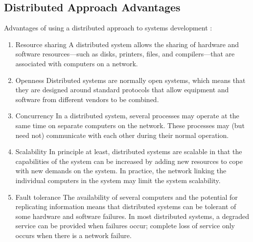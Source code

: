 \documentclass[12pt,a4paper,final,twoside,onecolumn,titlepage]{book}
\begin{document}
\subsection{Distributed Approach Advantages}
Advantages of using a distributed approach to systems development \cite{SWE9}:
\begin{enumerate}
\item Resource sharing A distributed system allows the sharing of hardware and software resources—such as disks, printers, files, and compilers—that are associated with computers on a network.
\item Openness Distributed systems are normally open systems, which means that they are designed around standard protocols that allow equipment and software from different vendors to be combined.
\item Concurrency In a distributed system, several processes may operate at the same time on separate computers on the network. These processes may (but need not) communicate with each other during their normal operation.
\item Scalability In principle at least, distributed systems are scalable in that the capabilities of the system can be increased by adding new resources to cope with new demands on the system. In practice, the network linking the individual computers in the system may limit the system scalability.
\item Fault tolerance The availability of several computers and the potential for replicating information means that distributed systems can be tolerant of some hardware and software failures. In most distributed systems, a degraded service can be provided when failures occur; complete loss of service only occurs when there is a network failure.
\end{enumerate}
\end{document}
